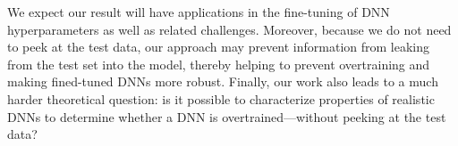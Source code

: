 We expect our result will have applications in the fine-tuning of DNN hyperparameters as well as related challenges.
Moreover, because we do not need to peek at the test data, our approach may prevent information from leaking from the test set into the model, thereby helping to prevent overtraining and making fined-tuned DNNs more robust.
%
Finally, our work also leads to a much harder theoretical question: is it possible to characterize properties of realistic DNNs to determine whether a DNN is overtrained---without peeking at the test data?  


